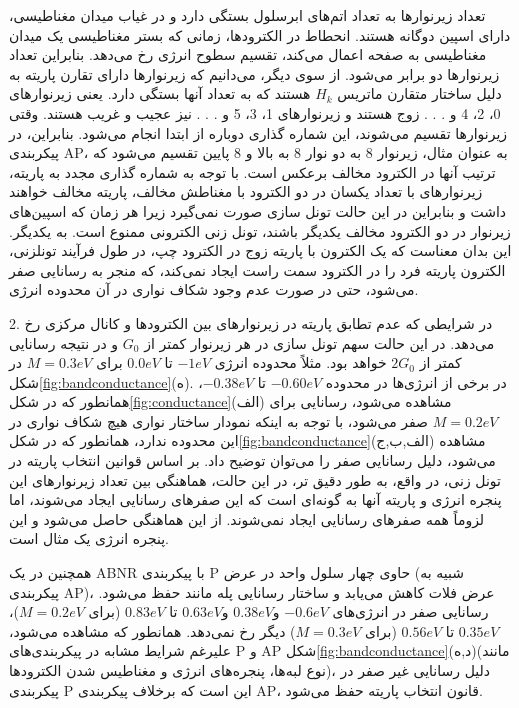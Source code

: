 تعداد زیر‌نوارها به تعداد اتم‌های ابرسلول بستگی دارد و در غیاب ‌میدان مغناطیسی، دارای اسپین دوگانه هستند. انحطاط در الکترودها، زمانی که بستر مغناطیسی یک ‌میدان مغناطیسی به صفحه اعمال ‌‌می‌‌کند، تقسیم سطوح انرژی رخ ‌‌می‌‌دهد. بنابراین تعداد زیر‌نوارها دو برابر ‌‌می‌‌شود. از سوی دیگر، ‌‌می‌‌دانیم که زیر‌نوارها دارای تقارن پاریته به دلیل ساختار متقارن ماتریس $H_k$ هستند که به تعداد آنها بستگی دارد. یعنی زیر‌نوارهای 0، 2، 4 و . . . زوج هستند و زیر‌نوارهای 1، 3، 5 و . . . نیز عجیب و غریب هستند. وقتی زیر‌نوارها تقسیم ‌‌می‌‌شوند، این شماره گذاری دوباره از ابتدا انجام ‌‌می‌‌شود. بنابراین، در پیکربندی \gls{AP}، به عنوان مثال، زیر‌نوار 8 به دو نوار 8 به بالا و 8 پایین تقسیم ‌‌می‌‌شود که ترتیب آنها در الکترود مخالف برعکس است. با توجه به شماره گذاری مجدد به پاریته، زیر‌نوارهای با تعداد یکسان در دو الکترود با مغناطش مخالف، پاریته مخالف خواهند داشت و بنابراین در این حالت تونل سازی صورت نمی‌‌گیرد زیرا هر زمان که اسپین‌های زیر‌نوار در دو الکترود مخالف یکدیگر باشند، تونل زنی الکترونی ممنوع است. به یکدیگر. این بدان معناست که یک الکترون با پاریته زوج در الکترود چپ، در طول فرآیند تونلزنی، الکترون پاریته فرد را در الکترود سمت راست ایجاد نمی‌کند، که منجر به رسانایی صفر ‌می‌شود، حتی در صورت عدم وجود شکاف نواری در آن محدوده انرژی. 

2. در شرایطی که عدم تطابق پاریته در زیر‌نوارهای بین الکترودها و کانال مرکزی رخ ‌‌می‌‌دهد. در این حالت سهم تونل سازی در هر زیر‌نوار کمتر از $G_0$ و در نتیجه رسانایی کمتر از $2 G_0$ خواهد بود. مثلاً محدوده انرژی $-1 eV$ تا $0.0 eV$ برای $M = 0.3 eV$ در شکل\ref{fig:bandconductance}(ه). در برخی از انرژی‌ها در محدوده $-0.60 eV$ تا $-0.38 eV$، همانطور که در شکل\ref{fig:conductance}(الف) مشاهده ‌‌می‌‌شود، رسانایی برای $M = 0.2 eV$ صفر ‌‌می‌‌شود، با توجه به اینکه نمودار ساختار نواری هیچ شکاف نواری در این محدوده ندارد، همانطور که در شکل\ref{fig:bandconductance}(الف,ب,ج) مشاهده ‌‌می‌‌شود، دلیل رسانایی صفر را ‌‌می‌‌توان توضیح داد. بر اساس قوانین انتخاب پاریته در تونل زنی، در واقع، به طور دقیق تر، در این حالت، هماهنگی بین تعداد زیر‌نوارهای این پنجره انرژی و پاریته آنها به گونه‌ای است که این صفرهای رسانایی ایجاد ‌‌می‌‌شوند، اما لزوماً همه صفرهای رسانایی ایجاد نمی‌‌شوند. از این هماهنگی حاصل ‌‌می‌‌شود و این پنجره انرژی یک مثال است.

همچنین در یک \gls{ABNR} با پیکربندی \gls{P} حاوی چهار سلول واحد در عرض (شبیه به پیکربندی \gls{AP})، عرض فلات کاهش ‌‌می‌‌یابد و ساختار رسانایی پله مانند حفظ ‌‌می‌‌شود. رسانایی صفر در انرژی‌های $-0.6 eV$ و$0.38 eV$ و$0.63 eV$ تا $0.83 eV$ (برای $M = 0.2 eV$)، $0.35 eV$ تا $0.56 eV$ (برای $M = 0.3 eV$) دیگر رخ نمی‌‌دهد. همانطور که مشاهده ‌‌می‌‌شود، علیرغم شرایط مشابه در پیکربندی‌های \gls{P} و \gls{AP} شکل\ref{fig:bandconductance}(د,ه)(مانند نوع لبه‌ها، پنجره‌های انرژی و مغناطیس شدن الکترودها)، دلیل رسانایی غیر صفر در پیکربندی \gls{P} این است که برخلاف پیکربندی \gls{AP}، قانون انتخاب پاریته حفظ ‌‌می‌‌شود. 

